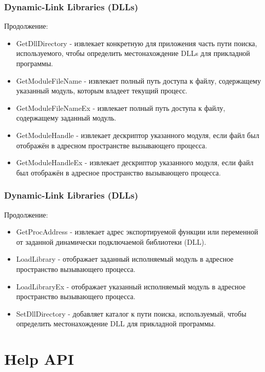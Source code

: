 \documentclass{beamer}
\begin{document}

\begin{frame}
\frametitle{Dynamic-Link Libraries (DLLs)}

Продолжение:
\begin{itemize}
\item GetDllDirectory - извлекает конкретную для приложения часть пути поиска, используемого, чтобы определить местонахождение DLLs для прикладной программы.
\item GetModuleFileName - извлекает полный путь доступа к файлу, содержащему указанный модуль, которым владеет текущий процесс.
\item GetModuleFileNameEx - извлекает полный путь доступа к файлу, содержащему заданный модуль.
\item GetModuleHandle - извлекает дескриптор указанного модуля, если файл был отображён в адресном пространстве вызывающего процесса.
\item GetModuleHandleEx - извлекает дескриптор указанного модуля, если файл был отображён в адресное пространство вызывающего процесса.
\end{itemize}

\end{frame}


\begin{frame}
\frametitle{Dynamic-Link Libraries (DLLs)}

Продолжение:
\begin{itemize}
\item GetProcAddress - извлекает адрес экспортируемой функции или переменной от заданной динамически подключаемой библиотеки (DLL).
\item LoadLibrary - отображает заданный исполняемый модуль в адресное пространство вызывающего процесса.
\item LoadLibraryEx - отображает указанный исполняемый модуль в адресное пространство вызывающего процесса. 
\item SetDllDirectory - добавляет каталог к пути поиска, используемый, чтобы определить местонахождение DLL для прикладной программы.
\end{itemize}

\end{frame}

\section{Help API}
\end{document}
